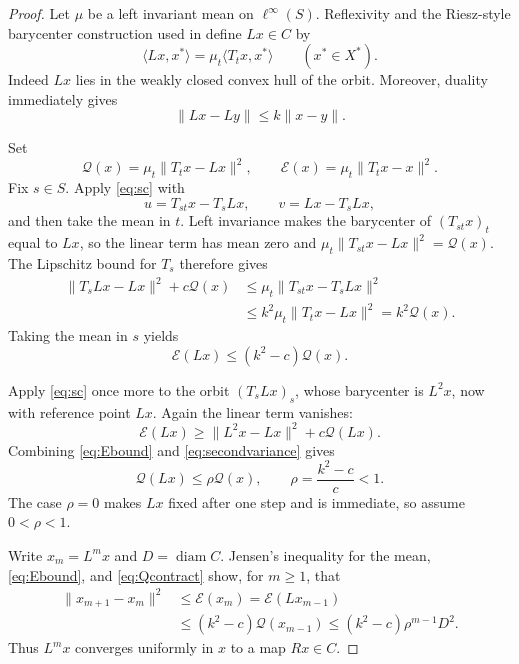 \documentclass[11pt]{article}
\newcommand{\E}{\mathcal E}
\newcommand{\Q}{\mathcal Q}
\begin{document}
\begin{proof}
Let $\mu$ be a left invariant mean on $\ell^\infty(S)$.  Reflexivity and the
Riesz-style barycenter construction used in \cite{Wisnicki} define $Lx\in C$
by
\begin{equation}\label{eq:L}
 \langle Lx,x^*\rangle
 =\mu_t\langle T_tx,x^*\rangle\qquad(x^*\in X^*).
\end{equation}
Indeed $Lx$ lies in the weakly closed convex hull of the orbit.  Moreover,
duality immediately gives
\begin{equation}\label{eq:Llip}
 \|Lx-Ly\|\le k\|x-y\|.
\end{equation}

Set
\[
 \Q(x)=\mu_t\|T_tx-Lx\|^2,
 \qquad
 \E(x)=\mu_t\|T_tx-x\|^2.
\]
Fix $s\in S$.  Apply \eqref{eq:sc} with
\[
 u=T_{st}x-T_sLx,
 \qquad v=Lx-T_sLx,
\]
and then take the mean in $t$.  Left invariance makes the barycenter of
$(T_{st}x)_t$ equal to $Lx$, so the linear term has mean zero and
$\mu_t\|T_{st}x-Lx\|^2=\Q(x)$.  The Lipschitz bound for $T_s$ therefore gives
\begin{align}
 \|T_sLx-Lx\|^2+c\Q(x)
 &\le \mu_t\|T_{st}x-T_sLx\|^2 \\
 &\le k^2\mu_t\|T_tx-Lx\|^2=k^2\Q(x).
\end{align}
Taking the mean in $s$ yields
\begin{equation}\label{eq:Ebound}
 \E(Lx)\le(k^2-c)\Q(x).
\end{equation}

Apply \eqref{eq:sc} once more to the orbit $(T_sLx)_s$, whose barycenter is
$L^2x$, now with reference point $Lx$.  Again the linear term vanishes:
\begin{equation}\label{eq:secondvariance}
 \E(Lx)\ge \|L^2x-Lx\|^2+c\Q(Lx).
\end{equation}
Combining \eqref{eq:Ebound} and \eqref{eq:secondvariance} gives
\begin{equation}\label{eq:Qcontract}
 \Q(Lx)\le\rho\Q(x),
 \qquad \rho=\frac{k^2-c}{c}<1.
\end{equation}
The case $\rho=0$ makes $Lx$ fixed after one step and is immediate, so assume
$0<\rho<1$.

Write $x_m=L^mx$ and $D=\operatorname{diam}C$.  Jensen's inequality for the
mean, \eqref{eq:Ebound}, and \eqref{eq:Qcontract} show, for $m\ge1$, that
\begin{align}
 \|x_{m+1}-x_m\|^2
 &\le \E(x_m)=\E(Lx_{m-1}) \\
 &\le(k^2-c)\Q(x_{m-1})
 \le(k^2-c)\rho^{m-1}D^2.\label{eq:increments}
\end{align}
Thus $L^mx$ converges uniformly in $x$ to a map $Rx\in C$.


\end{proof}
\end{document}
